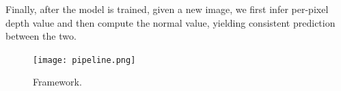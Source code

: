 Finally, after the model is trained, given a new image,  we first infer per-pixel depth value and then compute the normal value, yielding consistent prediction between the two.


\begin{figure}
\centering
\texttt{[image: pipeline.png]}
\caption{Framework.}
\label{fig:pipeline}
\end{figure}



